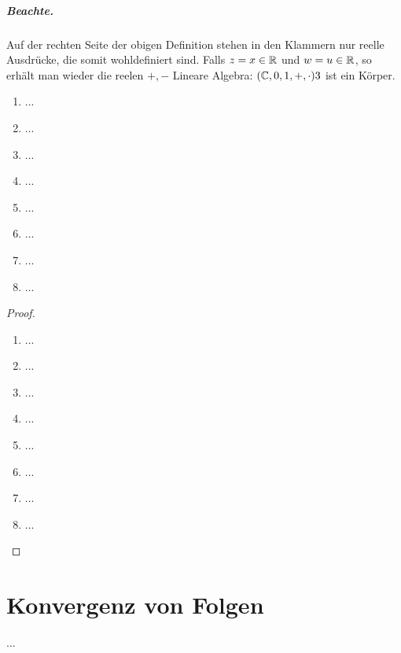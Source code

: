 \documentclass[12pt]{scrreprt}
\begin{document}
\paragraph{Beachte.} Auf der rechten Seite der obigen Definition stehen in den Klammern nur reelle Ausdrücke, die somit wohldefiniert sind.
Falls $z=x \in \mathbb{R}$ und $w=u \in \mathbb{R}$, so erhält man wieder die reelen $+, -$
Lineare Algebra: $(\mathbb{C},0,1,+,\cdot)3$ ist ein Körper.

\begin{dfn}\label{dfn:zahlen.komplex}

\end{dfn}

\begin{bsp*}

\end{bsp*}

\begin{satz}\label{satz:zahlen.kreg}
\begin{enumerate}
\item ...\label{satz:zahlen.kreg.a}
\item ...\label{satz:zahlen.kreg.b}
\item ...\label{satz:zahlen.kreg.c}
\item ...\label{satz:zahlen.kreg.d}
\item ...\label{satz:zahlen.kreg.e}
\item ...\label{satz:zahlen.kreg.f}
\item ...\label{satz:zahlen.kreg.g}
\item ...\label{satz:zahlen.kreg.h}
\end{enumerate}
\end{satz}
\begin{proof}
\begin{enumerate}
\item ...
\item ...
\item ...
\item ...
\item ...
\item ...
\item ...
\item ...
\end{enumerate}
\end{proof}

\chapter{Konvergenz von Folgen}
...
\end{document}
